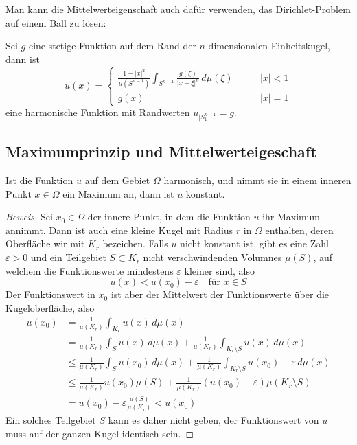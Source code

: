 Man kann die Mittelwerteigenschaft auch dafür verwenden, das Dirichlet-Problem
auf einem Ball zu lösen:

\begin{satz}
Sei $g$ eine stetige Funktion auf dem Rand der $n$-dimensio\-nalen
Einheitskugel, dann ist
\[
u(x)=\begin{cases}
\displaystyle \frac{1-|x|^2}{\mu(S^{n-1})}
\int_{S^{n-1}}\frac{g(\xi)}{|x-\xi|^n}\,d\mu(\xi)&\qquad |x|<1\\
g(x)&\qquad |x|=1
\end{cases}
\]
eine harmonische Funktion mit Randwerten $u_{|S_1^{n-1}}=g$.
\end{satz}

\subsection{Maximumprinzip und Mittelwerteigeschaft}
\begin{satz}[Maximumprinzip]Ist die Funktion $u$ auf dem Gebiet
$\Omega$ harmonisch, und nimmt sie in einem inneren Punkt $x\in\Omega$
ein Maximum an, dann ist $u$ konstant.
\end{satz}

\begin{proof}[Beweis]
Sei $x_0\in\Omega$ der innere Punkt, in dem die Funktion $u$
ihr Maximum annimmt. Dann ist auch eine kleine Kugel mit Radius
$r$ in $\Omega$ enthalten, deren Oberfläche wir mit $K_r$
bezeichen. Falls $u$ nicht konstant ist, gibt
es eine Zahl $\varepsilon > 0$ und 
ein Teilgebiet $S\subset K_r$ nicht verschwindenden Volumnes $\mu(S)$,
auf welchem die Funktionswerte
mindestens $\varepsilon$ kleiner sind, also
\[
u(x)<u(x_0)-\varepsilon\quad\text{für $x\in S$}
\]
Der Funktionswert in $x_0$ ist aber der Mittelwert der Funktionswerte
über die Kugeloberfläche, also
\begin{align*}
u(x_0)
&=
\frac1{\mu(K_r)}\int_{K_r}u(x)\,d\mu(x)
\\
&=\frac1{\mu(K_r)}\int_Su(x)\,d\mu(x)+\frac1{\mu(K_r)}\int_{K_r\setminus S}u(x)\,d\mu(x)
\\
&\le \frac1{\mu(K_r)}\int_S u(x_0)\,d\mu(x)+\frac1{\mu(K_r)}\int_{K_r\setminus S}u(x_0)-\varepsilon\,d\mu(x)
\\
&\le \frac1{\mu(K_r)}u(x_0)\mu(S)+\frac1{\mu(K_r)}(u(x_0)-\varepsilon)\mu(K_r\setminus S)
\\
&=
u(x_0)-\varepsilon\frac{\mu(S)}{\mu(K_r)}<u(x_0)
\end{align*}
Ein solches Teilgebiet $S$ kann es daher nicht geben, der Funktionswert
von $u$ muss auf der ganzen Kugel identisch sein.
\end{proof}


